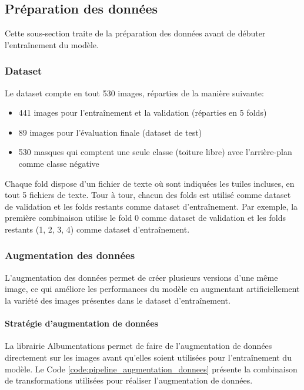 \subsection{Préparation des données}
Cette sous-section traite de la préparation des données avant de débuter l'entraînement du modèle.

\subsubsection{Dataset}
Le dataset compte en tout 530 images, réparties de la manière suivante:
\begin{itemize}
    \item 441 images pour l'entraînement et la validation (réparties en 5 folds)
    \item 89 images pour l'évaluation finale (dataset de test)
    \item 530 masques qui comptent une seule classe (toiture libre) avec l'arrière-plan comme classe négative
\end{itemize}

Chaque fold dispose d'un fichier de texte où sont indiquées les tuiles incluses, en tout 5 fichiers de texte. Tour à tour, chacun des folds est utilisé comme dataset de validation et les folds restants comme dataset d'entraînement. Par exemple, la première combinaison utilise le fold 0 comme dataset de validation et les folds restants (1, 2, 3, 4) comme dataset d'entraînement.

\subsubsection{Augmentation des données}
\label{subsubsec:augmentation_donnees}
L'augmentation des données permet de créer plusieurs versions d'une même image, ce qui améliore les performances du modèle en augmentant artificiellement la variété des images présentes dans le dataset d'entraînement.

\paragraph{Stratégie d'augmentation de données}
La librairie Albumentations \cite{albumentations_albumentations_nodate} permet de faire de l'augmentation de données directement sur les images avant qu'elles soient utilisées pour l'entraînement du modèle. Le Code \ref{code:pipeline_augmentation_donnees} présente la combinaison de transformations utilisées pour réaliser l'augmentation de données.

